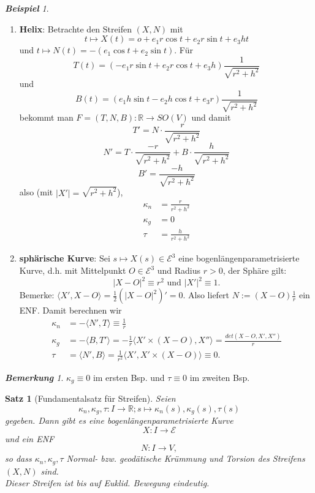 \documentclass[a4paper,oneside,11pt,DIV=12,parskip=half]{scrartcl}
\newcommand{\R}{\mathbb R}
\newcommand{\E}{\mathcal E}
\theoremstyle{plain}
\newtheorem{theorem}{Satz}[section]
\theoremstyle{definition}
\newtheorem{remark, definition}[theorem]{Bemerkung und Definition.}
\newtheorem{lemma, definition}[theorem]{Lemma und Definition.}
\theoremstyle{remark}
\newtheorem*{remark}{\textbf{Bemerkung}}
\newtheorem*{example}{\textbf{Beispiel}}
\newtheorem*{remark, example}{\textbf{Bemerkung und Beispiel}}
\begin{document}
\begin{example}
	
	\begin{enumerate}
		 \item \textbf{Helix}: Betrachte den Streifen $(X,N)$ mit $$t \mapsto X(t) = o + e_1r\cos t + e_2r \sin t + e_3ht$$ und 
		$t \mapsto N(t) = -(e_1\cos t + e_2 \sin t)$.
		Für $$T(t) = (-e_1r\sin t + e_2r \cos t + e_3h) \frac{1}{\sqrt{r^2 + h^2}}$$ und
		$$B(t) = (e_1h\sin t - e_2h \cos t + e_3r) \frac{1}{\sqrt{r^2 + h^2}}$$ bekommt man
		$F = (T,N,B): \R \rightarrow SO(V)$ und damit \[ T' = N \cdot \frac{r}{\sqrt{r^2 + h^2}} \]		\[ N' = T \cdot \frac{-r}{\sqrt{r^2 + h^2}} + B \cdot \frac{h}{\sqrt{r^2 + h^2}} \]	
		\[B'= \frac{-h}{\sqrt{r^2 +h^2}}\]
		also (mit $|X'|=\sqrt{r^2 + h^2}$),
		\begin{align*}
		\kappa_n & = \frac{r}{r^2 + h^2} \\
		\kappa_g & = 0 \\
		\tau & = \frac{h}{r^2+ h^2} 
		\end{align*} 
		
		\item \textbf{sphärische Kurve}: Sei $s\mapsto X(s) \in \E^3$ eine bogenlängenparametrisierte Kurve, d.h. mit Mittelpunkt $O \in \E^3$ und Radius $r>0$, der Sphäre gilt:
		\[ |X-O|^2 \equiv r^2 \text{ und } |X'|^2 \equiv 1  .\]
		Bemerke:
		$\langle X',X-O \rangle = \frac 12 (|X-O|^2)' = 0  .$
		Also liefert $N :=(X-O)\frac 1r $ ein ENF. Damit berechnen wir
		\begin{align*}
			\kappa_n &= - \langle N', T \rangle \equiv \frac 1r\\
			\kappa_g &= - \langle B, T' \rangle = - \frac 1r \langle X' \times (X-O), X'' \rangle = \frac{det(X-O,X',X'')}{r}\\
			\tau &= \langle N',B\rangle = \frac{1}{r^2} \langle X',X'\times (X-O) \rangle \equiv 0  .
			\end{align*}
		 
	\end{enumerate}

\end{example}

\begin{remark}
	$\kappa_g \equiv 0$ im ersten Bsp. und $\tau \equiv 0$ im zweiten Bsp.
\end{remark}

\begin{theorem}[Fundamentalsatz für Streifen]
	Seien $$\kappa_n, \kappa_g, \tau: I \rightarrow \R; s \mapsto \kappa_n(s), \kappa_g(s), \tau(s)$$ gegeben. Dann gibt es eine bogenlängenparametrisierte Kurve $$X: I \rightarrow \E$$ und ein ENF $$N: I \rightarrow V  ,$$ so dass $\kappa_n, \kappa_g, \tau$ Normal- bzw. geodätische Krümmung und Torsion des Streifens $(X,N)$ sind.\\ Dieser Streifen ist bis auf Euklid. Bewegung eindeutig.
\end{theorem}
\end{document}
